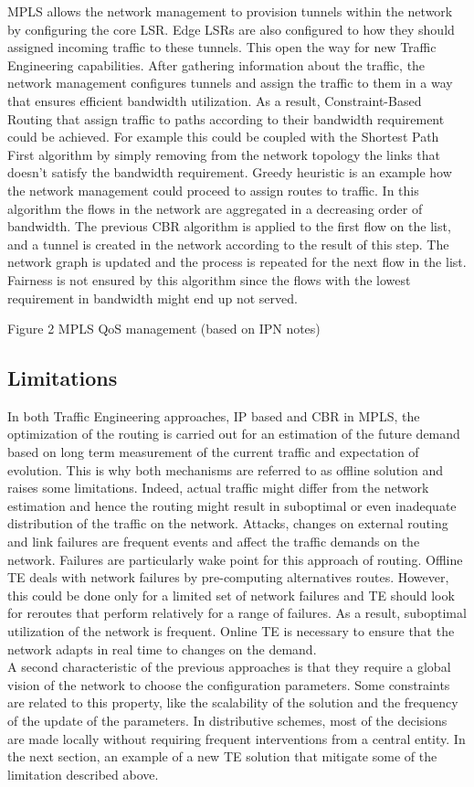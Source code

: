 	MPLS allows the network management to provision tunnels within the network by configuring the core LSR. Edge LSRs are also configured to how they should assigned incoming  traffic to these tunnels. This open the way for new Traffic Engineering capabilities. After gathering information about the traffic, the network management configures tunnels and assign the traffic to them in a way that ensures efficient bandwidth utilization. As a result, Constraint-Based Routing that assign traffic to paths according to their bandwidth requirement could be achieved. For example this could be coupled with the Shortest Path First algorithm by simply removing from the network topology the links that doesn't satisfy the bandwidth requirement. Greedy heuristic is an example how the network management could proceed to assign routes to traffic. In this algorithm the flows in the network are aggregated in a decreasing order of bandwidth. The previous CBR algorithm is applied to the first flow on the list, and a tunnel is created in the network according to the result of this step. The network graph is updated and the process is repeated for the next flow in the list. Fairness is not ensured by this algorithm since the flows with the lowest requirement in bandwidth might end up not served.

Figure 2 MPLS QoS management (based on IPN notes)

\subsection{Limitations}
	In both Traffic Engineering approaches, IP based and CBR in MPLS, the optimization of the routing is carried out for an estimation of the future demand based on long term measurement of the current traffic and expectation of evolution.  This is why both mechanisms are referred to as offline solution and raises some limitations. Indeed, actual traffic might differ from the network estimation and hence the routing might result in suboptimal or even inadequate distribution of the traffic on the network. Attacks, changes on external routing and link failures are frequent events and affect the traffic demands on the network. Failures are particularly wake point for this approach of routing. Offline TE deals with network failures by pre-computing alternatives routes. However, this could be done only for a limited set of network failures and TE should look for reroutes that perform relatively for a range of failures. As a result, suboptimal utilization of the network is frequent. Online TE is necessary to ensure that the network adapts in real time to changes on the demand.
\\ A second characteristic of the previous approaches is that they require a global vision of the network to choose the configuration parameters. Some constraints are related to this property, like the scalability of the solution and the frequency of the update of the parameters. In distributive schemes, most of the decisions are made locally without requiring frequent interventions from a  central entity. 
In the next section, an example of a new TE solution that mitigate some of the limitation described above.
